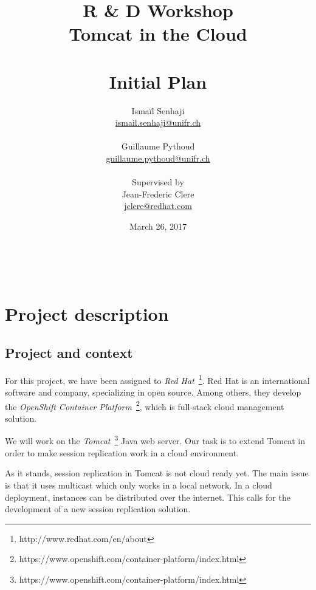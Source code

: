 \documentclass[11pt,a4paper]{article}
\title{%
    \textbf{R \& D Workshop} \\
    Tomcat in the Cloud \\
    \\
    \textbf{Initial Plan}
}
\author{%
    Ismaïl Senhaji \\
    \small \href{mailto:ismail.senhaji@unifr.ch}{ismail.senhaji@unifr.ch} \\
    \\
    Guillaume Pythoud \\
    \small \href{mailto:guillaume.pythoud@unifr.ch}{guillaume.pythoud@unifr.ch}
    \\
    \\
    Supervised by \\
    Jean-Frederic Clere \\
    \small \href{mailto:jclere@redhat.com}{jclere@redhat.com}
}
\date{March 26, 2017}
\begin{document}
\graphicspath{{fig/}}

\maketitle

\begin{figure}[b]
    \centering
    \\
\end{figure}

\newpage
\tableofcontents

\newpage


\section{Project description}

\subsection{Project and context}

For this project, we have been assigned to \emph{Red
    Hat}~\footnote{http://www.redhat.com/en/about}. Red Hat is an international
software and company, specializing in open source.  Among others, they develop
the \emph{OpenShift Container
    Platform}~\footnote{https://www.openshift.com/container-platform/index.html},
which is full-stack cloud management solution.

We will work on the
\emph{Tomcat}~\footnote{https://www.openshift.com/container-platform/index.html}
Java web server. Our task is to extend Tomcat in order to make session
replication work in a cloud environment.

As it stands, session replication in Tomcat is not cloud ready yet. The main
issue is that it uses multicast which only works in a local network. In a cloud
deployment, instances can be distributed over the internet. This calls for the
development of a new session replication solution.
\end{document}
